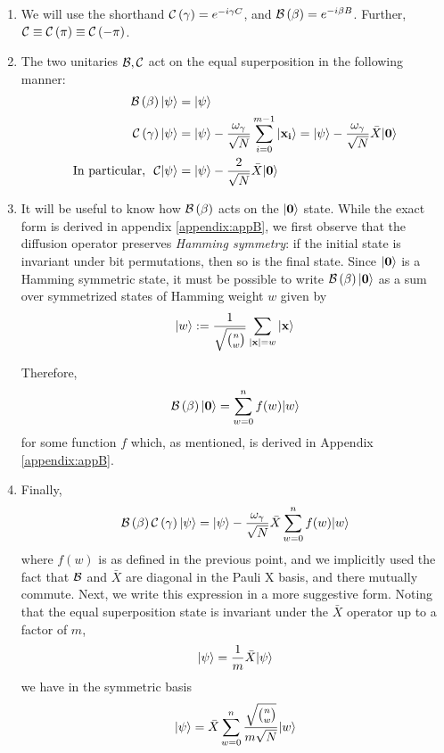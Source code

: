 \documentclass[11pt]{article}
\begin{document}
\begin{enumerate}
\item We will use the shorthand $\mathcal{C}\left(\gamma\right) = e^{-i\gamma C}$, and $\mathcal{B}\left(\beta\right) = e^{-i\beta B}$. Further, $\mathcal{C}\equiv\mathcal{C}\left(\pi\right) \equiv \mathcal{C}\left(-\pi\right)$. 
\item The two unitaries $\mathcal{B}, \mathcal{C}$ act on the equal superposition in the following manner:
  \begin{align}
\mathcal{B}\left(\beta\right)|\psi\rangle &= |\psi\rangle\\
\mathcal{C}\left(\gamma\right)|\psi\rangle&= |\psi\rangle - \frac{\omega_\gamma}{\sqrt{N}}\sum\limits_{i=0}^{m-1}|\mathbf{x_i}\rangle = |\psi\rangle - \frac{\omega_\gamma}{\sqrt{N}}\bar{X}|\mathbf{0}\rangle  \\
\text{In particular, }\ \mathcal{C}|\psi\rangle &= |\psi\rangle - \frac{2}{\sqrt{N}}\bar{X}|\mathbf{0}\rangle
  \end{align}
\item It will be useful to know how $\mathcal{B}\left(\beta\right)$ acts on the $|\mathbf{0}\rangle$ state. While the exact form is derived in appendix \ref{appendix:appB}, we first observe that the diffusion operator preserves \emph{Hamming symmetry}: if the initial state is invariant under bit permutations, then so is the final state. Since $|\mathbf{0}\rangle$ is a Hamming symmetric state, it must be possible to write $\mathcal{B}\left(\beta\right)|\mathbf{0}\rangle$ as a sum over symmetrized states of Hamming weight $w$ given by 
  \begin{equation}
    |w\rangle := \frac{1}{\sqrt{\binom{n}{w}}}\sum\limits_{|\mathbf{x}|=w}^{}|\mathbf{x}\rangle
    \label{eq:hambasis}
\end{equation}

Therefore, 
\begin{equation}
\mathcal{B}\left(\beta\right)|\mathbf{0}\rangle = \sum\limits_{w=0}^{n}f(w)|w\rangle
\end{equation}
for some function $f$ which, as mentioned, is derived in Appendix \ref{appendix:appB}. 
\item Finally,
  \begin{equation}
    \mathcal{B}\left(\beta\right)\mathcal{C}\left(\gamma\right)|\psi\rangle = |\psi\rangle - \frac{\omega_\gamma}{\sqrt{N}}\bar{X}\sum\limits_{w=0}^{n}f(w)|w\rangle
    \label{eq:bc}
\end{equation}
where $f(w)$ is as defined in the previous point, and we implicitly used the fact that $\mathcal{B}$ and $\bar{X}$ are diagonal in the Pauli X basis, and there mutually commute. Next, we write this expression in a more suggestive form. Noting that the equal superposition state is invariant under the $\bar{X}$ operator up to a factor of $m$,
$$
|\psi\rangle = \frac{1}{m}\bar{X}|\psi\rangle
$$
we have in the symmetric basis
$$
|\psi\rangle = \bar{X}\sum\limits_{w=0}^{n}\frac{\sqrt{\binom n w}}{m\sqrt{N}}|w\rangle
$$


\end{enumerate}
\end{document}
